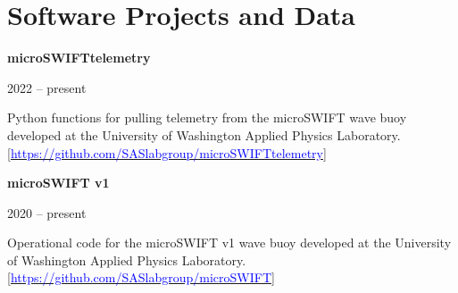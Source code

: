 \documentclass[letterpaper,11pt]{article}
\newenvironment{indentPar}[1]{
  \justifying
  \begin{list}{}{\setlength{\leftmargin}{#1}}%
  \item[]
}
{\end{list}}
\newcommand{\softwareDataEntry}[3]{
  \begin{minipage}[t]{.75\textwidth}
    \begin{flushleft}
      \textbf{#1}
    \end{flushleft}
    \end{minipage}%
    \hfill%
    \begin{minipage}[t]{.23\textwidth}
      \begin{flushright}
        #2%
      \end{flushright}%
    \end{minipage}%
    \vspace{-8pt}%
    \begin{indentPar}{0.5cm}%
      #3%
    \end{indentPar}%
    \vspace{-5pt}%
}
\begin{document}
\section{Software Projects and Data}
%
%
\softwareDataEntry
  {microSWIFTtelemetry}
  {2022 -- present}
  {Python functions for pulling telemetry from the microSWIFT wave buoy developed at the University of Washington Applied Physics Laboratory.
  \href{https://github.com/SASlabgroup/microSWIFTtelemetry}{[\textcolor{blue}{https://github.com/SASlabgroup/microSWIFTtelemetry}]}}
\softwareDataEntry
  {microSWIFT v1}
  {2020 -- present}
  {Operational code for the microSWIFT v1 wave buoy developed at the University of Washington Applied Physics Laboratory. \href{https://github.com/SASlabgroup/microSWIFT}{[\textcolor{blue}{https://github.com/SASlabgroup/microSWIFT}]}}

\end{document}
